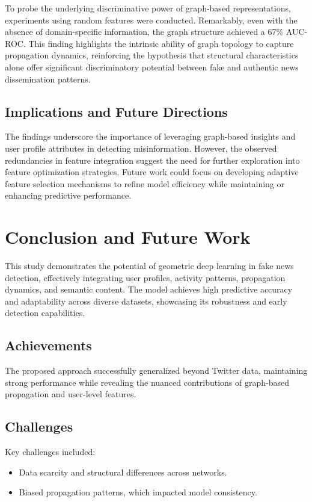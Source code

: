 \documentclass[sigconf,nonacm]{acmart}
\begin{document}
To probe the underlying discriminative power of graph-based representations, experiments using random features were conducted. Remarkably, even with the absence of domain-specific information, the graph structure achieved a 67\% AUC-ROC. This finding highlights the intrinsic ability of graph topology to capture propagation dynamics, reinforcing the hypothesis that structural characteristics alone offer significant discriminatory potential between fake and authentic news dissemination patterns.

\subsection{Implications and Future Directions}

The findings underscore the importance of leveraging graph-based insights and user profile attributes in detecting misinformation. However, the observed redundancies in feature integration suggest the need for further exploration into feature optimization strategies. Future work could focus on developing adaptive feature selection mechanisms to refine model efficiency while maintaining or enhancing predictive performance.


\section{Conclusion and Future Work}

This study demonstrates the potential of geometric deep learning in fake news detection, effectively integrating user profiles, activity patterns, propagation dynamics, and semantic content. The model achieves high predictive accuracy and adaptability across diverse datasets, showcasing its robustness and early detection capabilities.

\subsection*{Achievements}
The proposed approach successfully generalized beyond Twitter data, maintaining strong performance while revealing the nuanced contributions of graph-based propagation and user-level features.

\subsection*{Challenges}
Key challenges included:
\begin{itemize}
    \item Data scarcity and structural differences across networks.
    \item Biased propagation patterns, which impacted model consistency.
\end{itemize}
\end{document}
